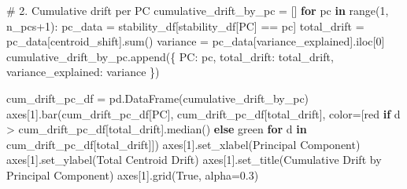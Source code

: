 \documentclass[
  letterpaper,
  DIV=11,
  numbers=noendperiod]{scrartcl}
\newenvironment{Shaded}{\begin{snugshade}}{\end{snugshade}}
\newcommand{\BuiltInTok}[1]{\textcolor[rgb]{0.00,0.23,0.31}{#1}}
\newcommand{\CommentTok}[1]{\textcolor[rgb]{0.37,0.37,0.37}{#1}}
\newcommand{\ControlFlowTok}[1]{\textcolor[rgb]{0.00,0.23,0.31}{\textbf{#1}}}
\newcommand{\DecValTok}[1]{\textcolor[rgb]{0.68,0.00,0.00}{#1}}
\newcommand{\FloatTok}[1]{\textcolor[rgb]{0.68,0.00,0.00}{#1}}
\newcommand{\KeywordTok}[1]{\textcolor[rgb]{0.00,0.23,0.31}{\textbf{#1}}}
\newcommand{\NormalTok}[1]{\textcolor[rgb]{0.00,0.23,0.31}{#1}}
\newcommand{\OperatorTok}[1]{\textcolor[rgb]{0.37,0.37,0.37}{#1}}
\newcommand{\StringTok}[1]{\textcolor[rgb]{0.13,0.47,0.30}{#1}}
\newcommand{\VariableTok}[1]{\textcolor[rgb]{0.07,0.07,0.07}{#1}}
\renewenvironment{Shaded}{%
  \begin{tcolorbox}[%
    enhanced,%
    colback=codebg,%
    colframe=codebg,%
    borderline west={3pt}{0pt}{sectionblue},%
    fontupper=\small\ttfamily,%
    boxrule=0pt,%
    arc=0pt,%
    boxsep=5pt,%
    left=2mm,%
    right=2mm,%
    top=2mm,%
    bottom=2mm%
  ]%
}{%
  \end{tcolorbox}%
}
\begin{document}
\begin{Shaded}
\begin{Highlighting}[]
\CommentTok{\# 2. Cumulative drift per PC}
\NormalTok{cumulative\_drift\_by\_pc }\OperatorTok{=}\NormalTok{ []}
\ControlFlowTok{for}\NormalTok{ pc }\KeywordTok{in} \BuiltInTok{range}\NormalTok{(}\DecValTok{1}\NormalTok{, n\_pcs}\OperatorTok{+}\DecValTok{1}\NormalTok{):}
\NormalTok{    pc\_data }\OperatorTok{=}\NormalTok{ stability\_df[stability\_df[}\StringTok{\textquotesingle{}PC\textquotesingle{}}\NormalTok{] }\OperatorTok{==}\NormalTok{ pc]}
\NormalTok{    total\_drift }\OperatorTok{=}\NormalTok{ pc\_data[}\StringTok{\textquotesingle{}centroid\_shift\textquotesingle{}}\NormalTok{].}\BuiltInTok{sum}\NormalTok{()}
\NormalTok{    variance }\OperatorTok{=}\NormalTok{ pc\_data[}\StringTok{\textquotesingle{}variance\_explained\textquotesingle{}}\NormalTok{].iloc[}\DecValTok{0}\NormalTok{]}
\NormalTok{    cumulative\_drift\_by\_pc.append(\{}
        \StringTok{\textquotesingle{}PC\textquotesingle{}}\NormalTok{: pc,}
        \StringTok{\textquotesingle{}total\_drift\textquotesingle{}}\NormalTok{: total\_drift,}
        \StringTok{\textquotesingle{}variance\_explained\textquotesingle{}}\NormalTok{: variance}
\NormalTok{    \})}

\NormalTok{cum\_drift\_pc\_df }\OperatorTok{=}\NormalTok{ pd.DataFrame(cumulative\_drift\_by\_pc)}
\NormalTok{axes[}\DecValTok{1}\NormalTok{].bar(cum\_drift\_pc\_df[}\StringTok{\textquotesingle{}PC\textquotesingle{}}\NormalTok{], cum\_drift\_pc\_df[}\StringTok{\textquotesingle{}total\_drift\textquotesingle{}}\NormalTok{], }
\NormalTok{            color}\OperatorTok{=}\NormalTok{[}\StringTok{\textquotesingle{}red\textquotesingle{}} \ControlFlowTok{if}\NormalTok{ d }\OperatorTok{\textgreater{}}\NormalTok{ cum\_drift\_pc\_df[}\StringTok{\textquotesingle{}total\_drift\textquotesingle{}}\NormalTok{].median() }\ControlFlowTok{else} \StringTok{\textquotesingle{}green\textquotesingle{}} 
                   \ControlFlowTok{for}\NormalTok{ d }\KeywordTok{in}\NormalTok{ cum\_drift\_pc\_df[}\StringTok{\textquotesingle{}total\_drift\textquotesingle{}}\NormalTok{]])}
\NormalTok{axes[}\DecValTok{1}\NormalTok{].set\_xlabel(}\StringTok{\textquotesingle{}Principal Component\textquotesingle{}}\NormalTok{)}
\NormalTok{axes[}\DecValTok{1}\NormalTok{].set\_ylabel(}\StringTok{\textquotesingle{}Total Centroid Drift\textquotesingle{}}\NormalTok{)}
\NormalTok{axes[}\DecValTok{1}\NormalTok{].set\_title(}\StringTok{\textquotesingle{}Cumulative Drift by Principal Component\textquotesingle{}}\NormalTok{)}
\NormalTok{axes[}\DecValTok{1}\NormalTok{].grid(}\VariableTok{True}\NormalTok{, alpha}\OperatorTok{=}\FloatTok{0.3}\NormalTok{)}


\end{Highlighting}
\end{Shaded}
\end{document}
